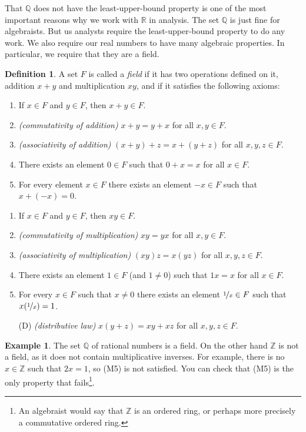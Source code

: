 \documentclass[12pt]{book}
\newcommand{\R}{{\mathbb{R}}}
\newcommand{\Z}{{\mathbb{Z}}}
\newcommand{\Q}{{\mathbb{Q}}}
\newcommand{\myindex}[1]{#1\index{#1}}
\theoremstyle{plain}
\theoremstyle{remark}
\theoremstyle{definition}
\newtheorem{defn}[thm]{Definition}
\theoremstyle{exercise}
\theoremstyle{example}
\newtheorem{example}[thm]{Example}
\begin{document}
That $\Q$ does not have the least-upper-bound property is one of the most
important reasons why we work with $\R$ in analysis.  The set $\Q$
is just fine for algebraists.  But us analysts require the least-upper-bound
property to do any work.
We also require our real numbers to have many algebraic properties.  In
particular, we require that they are a field.


\begin{defn}
A set $F$ is called a \emph{\myindex{field}} if it has two operations
defined on it, addition $x+y$ and multiplication $xy$, and if it satisfies
the following axioms:
\begin{enumerate}[({A}1)]
\item If $x \in F$ and $y \in F$, then $x+y \in F$.
\item \emph{(commutativity of addition)}
$x+y = y+x$ for all $x,y \in F$.
\item \emph{(associativity of addition)}
$(x+y)+z = x+(y+z)$ for all $x,y,z \in F$.
\item There exists an element $0 \in F$ such that
$0+x = x$ for all $x \in F$.
\item For every element $x\in F$ there exists an element $-x \in F$
such that $x + (-x) = 0$.
\end{enumerate}
\begin{enumerate}[({M}1)]
\item If $x \in F$ and $y \in F$, then $xy \in F$.
\item \emph{(commutativity of multiplication)}
$xy = yx$ for all $x,y \in F$.
\item \emph{(associativity of multiplication)}
$(xy)z = x(yz)$ for all $x,y,z \in F$.
\item There exists an element $1 \in F$ (and $1 \not= 0$) such that
$1x = x$ for all $x \in F$.
\item For every $x\in F$ such that $x \not= 0$ there exists an element
$\nicefrac{1}{x} \in F$
such that $x(\nicefrac{1}{x}) = 1$.
\item[(D)] \emph{(distributive law)} $x(y+z) = xy+xz$
for all $x,y,z \in F$.
\end{enumerate}
\end{defn}

\begin{example}
The set $\Q$ of rational numbers is a field.  On the other hand $\Z$ is not a
field, as it does not contain multiplicative inverses.  For example,
there is no $x \in \Z$ such that $2x = 1$, so (M5) is not satisfied.  You
can check that (M5) is the only property that fails\footnote{An algebraist would say that $\Z$ is an ordered
ring, or perhaps more precisely a commutative ordered ring.}.
\end{example}
\end{document}
